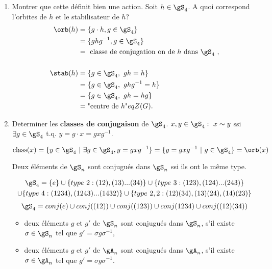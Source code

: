 \begin{exercise}

	\begin{enumerate}
		\item Montrer que cette définit bien une action. Soit $h\in\gS_4$. A quoi correspond l'orbites de $h$ et le stabilisateur de $h$?
		\begin{align*}
			\orb(h) &= \{g\cdot h, g\in\gS_4\}\\
			&= \{ghg^{-1}, g\in\gS_4\}\\
			&= \mbox{ classe de conjugation on de $h$ dans $\gS_4$ },
			\\
			\\
			\stab(h) &= \{g\in\gS_4,\ gh=h\}\\
			&= \{g\in\gS_4,\ ghg^{-1}=h\}\\
			&= \{g\in\gS_4,\ gh=hg\}\\
			&= \mbox{"centre de $h$"}  eq Z(G).
		\end{align*}

		\item Determiner les \textbf{classes de conjugaison} de $\gS_4$. $x,y\in \gS_4:\ x\sim y$ ssi $\exists g\in \gS_4$ t.q. $y=g\cdot x=gxg^{-1}$. 

		$$\mbox{class}(x)=\{y\in\gS_4\ |\ \exists g\in\gS_4, y=gxg^{-1}\}=\{y=gxg^{-1}\ |\ g\in\gS_4\} = \orb(x)$$

		\begin{rappel}
			Deux éléments de $\gS_n$ sont conjugués dans $\gS_n$ ssi ils ont le même type.
		\end{rappel}
		\begin{multline*}
			\gS_4=\{e\}\cup\{type\ 2: (12),(13)...(34)\}\cup\{type\ 3:(123),(124)...(243)\} \\ \cup\{type\ 4: (1234),(1243)...(1432)\}\cup\{type\ 2,2: (12)(34),(13)(24),(14)(23)\}
		\end{multline*}
		$$\gS_4=\\conj(e)\cup \\conj((12))\cup \\conj((123))\cup \\conj(1234)\cup \\conj((12)(34))$$

		\begin{remark}
			\leavevmode
			\begin{itemize}
				\item deux éléments $g$ et $g'$ de $\gS_n$ sont conjugués dans $\gS_n$, s'il existe $\sigma \in \gS_n$ tel que $g'=\sigma g \sigma^{-1}$,
				\item deux éléments $g$ et $g'$ de $\gA_n$ sont conjugués dans $\gA_n$, s'il existe $\sigma\in\gA_n$ tel que $g'=\sigma g\sigma^{-1}$.
			\end{itemize}
		\end{remark}


\end{enumerate}
\end{exercise}
